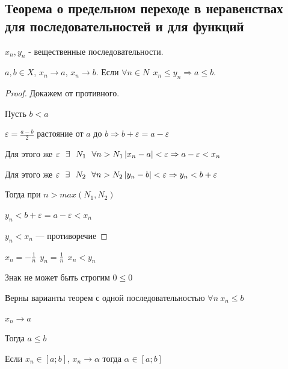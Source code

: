 \subsection{Теорема о предельном переходе в неравенствах для последовательностей и для функций}
    \begin{theorem*}
    $x_n , y_n$ - вещественные последовательности.
    
    $a, b \in X$, $x_n \to a$, $x_n \to b$. Если $\forall n \in N \ \ x_n \leqslant y_n \Rightarrow a \leqslant b$.
    \end{theorem*}
    \begin{proof}
    Докажем от противного.
    
    Пусть $b < a$
    
    $\varepsilon = \frac{a - b}{2}$ растояние от $a$ до $b \Rightarrow b + \varepsilon = a - \varepsilon$
    
    Для этого же $\varepsilon \ \ \exists \ \ N_1 \ \ \forall n > N_1 \abs{x_n - a} < \varepsilon \Rightarrow a - \varepsilon < x_n$
    
    Для этого же $\varepsilon \ \ \exists \ \ N_2 \ \ \forall n > N_2 \abs{y_n - b} < \varepsilon \Rightarrow y_n < b + \varepsilon$ 
    
    Тогда при $n > max(N_1, N_2)$
    
    $y_n < b + \varepsilon = a - \varepsilon < x_n$ 
    
    $y_n < x_n$ {---} противоречие
    \end{proof}
    
    \begin{remark}
        $x_n = -\frac{1}{n} \ \ y_n = \frac{1}{n} \ \ x_n < y_n$
        
        Знак не может быть строгим $ 0 \leqslant 0$
        
        Верны варианты теорем с одной последовательностью $\forall n \ x_n \leq b$
        
        $x_n \to a$
        
        Тогда $a \leqslant b$
        
        Если $x_n \in [a; b]$, $x_n \longrightarrow \alpha$ тогда $\alpha \in [a; b]$
    \end{remark}
\newpage
